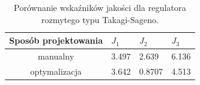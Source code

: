 \begin{table}[h]
	\caption{Porównanie wska\'zników jakości dla regulatora rozmytego typu Takagi-Sageno.}
	\label{fuzzy_sageno_wsk}
	\centering
	
	\begin{tabular}{|c|M{2.5cm}|M{2.5cm}|M{2.5cm}|}
		\hline
		Sposób projektowania &$J_1$&$J_2$&$J_3$\\
		\hline
		manualny &3.497&  2.639 &  6.136\\
		\hline
		optymalizacja &3.642&  0.8707 &  4.513\\
		\hline		
	\end{tabular}
\end{table}